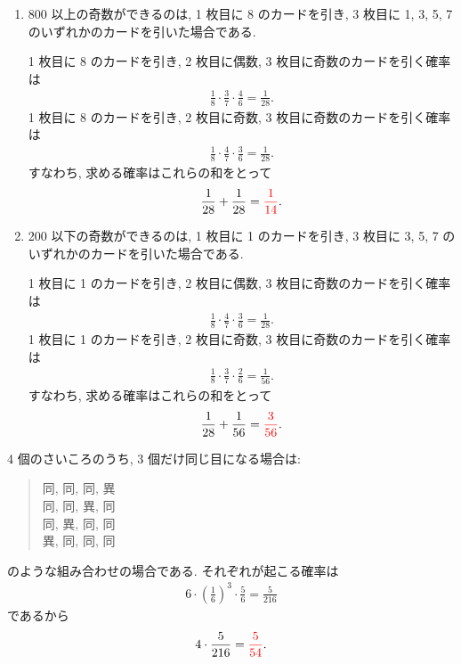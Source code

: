 \begin{enumerate}
	\item{
		800 以上の奇数ができるのは, 1 枚目に 8 のカードを引き, 3 枚目に 1, 3, 5, 7 のいずれかのカードを引いた場合である.

		1 枚目に 8 のカードを引き, 2 枚目に偶数, 3 枚目に奇数のカードを引く確率は
		\begin{align}
			\frac{1}{8}\cdot\frac{3}{7}\cdot\frac{4}{6} = \frac{1}{28}.
		\end{align}
		1 枚目に 8 のカードを引き, 2 枚目に奇数, 3 枚目に奇数のカードを引く確率は
		\begin{align}
			\frac{1}{8}\cdot\frac{4}{7}\cdot\frac{3}{6} = \frac{1}{28}.
		\end{align}
		すなわち, 求める確率はこれらの和をとって
		\begin{align}
			\frac{1}{28} + \frac{1}{28} = \textcolor{red}{\frac{1}{14}}.
		\end{align}
	}
	\item{
		200 以下の奇数ができるのは, 1 枚目に 1 のカードを引き, 3 枚目に 3, 5, 7 のいずれかのカードを引いた場合である.

		1 枚目に 1 のカードを引き, 2 枚目に偶数, 3 枚目に奇数のカードを引く確率は
		\begin{align}
			\frac{1}{8}\cdot\frac{4}{7}\cdot\frac{3}{6} = \frac{1}{28}.
		\end{align}
		1 枚目に 1 のカードを引き, 2 枚目に奇数, 3 枚目に奇数のカードを引く確率は
		\begin{align}
			\frac{1}{8}\cdot\frac{3}{7}\cdot\frac{2}{6} = \frac{1}{56}.
		\end{align}
		すなわち, 求める確率はこれらの和をとって
		\begin{align}
			\frac{1}{28} + \frac{1}{56} = \textcolor{red}{\frac{3}{56}}.
		\end{align}
	}
\end{enumerate}

4 個のさいころのうち, 3 個だけ同じ目になる場合は: 
\begin{quote}
	同, 同, 同, 異 \\
	同, 同, 異, 同 \\
	同, 異, 同, 同 \\
	異, 同, 同, 同
\end{quote}
のような組み合わせの場合である.
それぞれが起こる確率は
\begin{align}
	6\cdot\left(\frac{1}{6}\right)^{3}\cdot\frac{5}{6} = \frac{5}{216}
\end{align}
であるから
\begin{align}
	4\cdot\frac{5}{216} = \textcolor{red}{\frac{5}{54}}.
\end{align}

